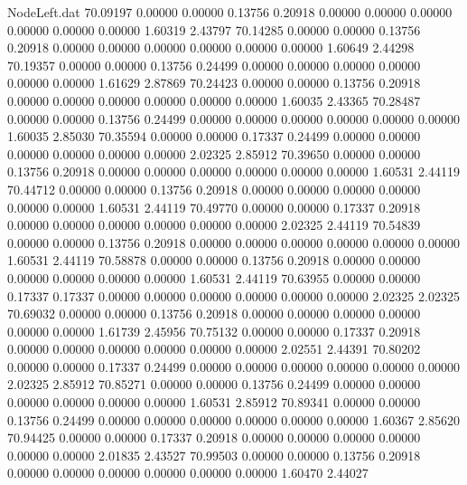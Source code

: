 \begin{filecontents}{NodeLeft.dat}
  70.09197    0.00000    0.00000     0.13756    0.20918    0.00000    0.00000    0.00000    0.00000    0.00000    0.00000    1.60319    2.43797
  70.14285    0.00000    0.00000     0.13756    0.20918    0.00000    0.00000    0.00000    0.00000    0.00000    0.00000    1.60649    2.44298
  70.19357    0.00000    0.00000     0.13756    0.24499    0.00000    0.00000    0.00000    0.00000    0.00000    0.00000    1.61629    2.87869
  70.24423    0.00000    0.00000     0.13756    0.20918    0.00000    0.00000    0.00000    0.00000    0.00000    0.00000    1.60035    2.43365
  70.28487    0.00000    0.00000     0.13756    0.24499    0.00000    0.00000    0.00000    0.00000    0.00000    0.00000    1.60035    2.85030
  70.35594    0.00000    0.00000     0.17337    0.24499    0.00000    0.00000    0.00000    0.00000    0.00000    0.00000    2.02325    2.85912
  70.39650    0.00000    0.00000     0.13756    0.20918    0.00000    0.00000    0.00000    0.00000    0.00000    0.00000    1.60531    2.44119
  70.44712    0.00000    0.00000     0.13756    0.20918    0.00000    0.00000    0.00000    0.00000    0.00000    0.00000    1.60531    2.44119
  70.49770    0.00000    0.00000     0.17337    0.20918    0.00000    0.00000    0.00000    0.00000    0.00000    0.00000    2.02325    2.44119
  70.54839    0.00000    0.00000     0.13756    0.20918    0.00000    0.00000    0.00000    0.00000    0.00000    0.00000    1.60531    2.44119
  70.58878    0.00000    0.00000     0.13756    0.20918    0.00000    0.00000    0.00000    0.00000    0.00000    0.00000    1.60531    2.44119
  70.63955    0.00000    0.00000     0.17337    0.17337    0.00000    0.00000    0.00000    0.00000    0.00000    0.00000    2.02325    2.02325
  70.69032    0.00000    0.00000     0.13756    0.20918    0.00000    0.00000    0.00000    0.00000    0.00000    0.00000    1.61739    2.45956
  70.75132    0.00000    0.00000     0.17337    0.20918    0.00000    0.00000    0.00000    0.00000    0.00000    0.00000    2.02551    2.44391
  70.80202    0.00000    0.00000     0.17337    0.24499    0.00000    0.00000    0.00000    0.00000    0.00000    0.00000    2.02325    2.85912
  70.85271    0.00000    0.00000     0.13756    0.24499    0.00000    0.00000    0.00000    0.00000    0.00000    0.00000    1.60531    2.85912
  70.89341    0.00000    0.00000     0.13756    0.24499    0.00000    0.00000    0.00000    0.00000    0.00000    0.00000    1.60367    2.85620
  70.94425    0.00000    0.00000     0.17337    0.20918    0.00000    0.00000    0.00000    0.00000    0.00000    0.00000    2.01835    2.43527
  70.99503    0.00000    0.00000     0.13756    0.20918    0.00000    0.00000    0.00000    0.00000    0.00000    0.00000    1.60470    2.44027

\end{filecontents}
